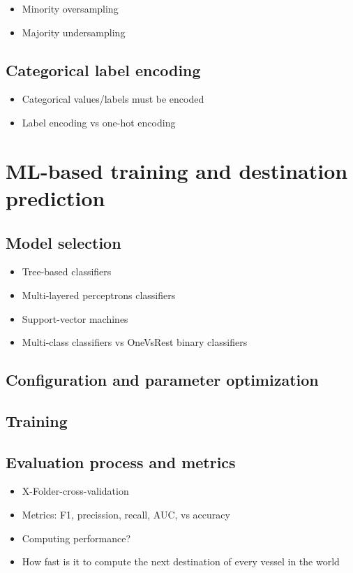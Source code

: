 \begin{itemize}
    \item Minority oversampling
    \item Majority undersampling
\end{itemize}

\subsection{Categorical label encoding}

\begin{itemize}
    \item Categorical values/labels must be encoded
    \item Label encoding vs one-hot encoding
\end{itemize}

\section{ML-based training and destination prediction}

\subsection{Model selection}

\begin{itemize}
    \item Tree-based classifiers
    \item Multi-layered perceptrons classifiers
    \item Support-vector machines
    \item Multi-class classifiers vs OneVsRest binary classifiers
\end{itemize}

\subsection{Configuration and parameter optimization}

\subsection{Training}

\subsection{Evaluation process and metrics}

\begin{itemize}
    \item X-Folder-cross-validation
    \item Metrics: F1, precission, recall, AUC, vs accuracy
    \item Computing performance?
    \item How fast is it to compute the next destination of every vessel in the world
\end{itemize}
